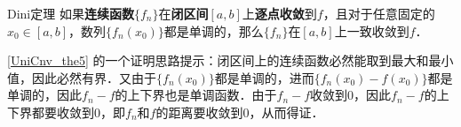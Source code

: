 \begin{theorem}{Dini定理}\label{UniCnv_the5}
如果\textbf{连续函数}$\{f_n\}$在\textbf{闭区间}$[a, b]$上\textbf{逐点收敛}到$f$，且对于任意固定的$x_0\in [a, b]$，数列$\{f_n(x_0)\}$都是单调的，那么$\{f_n\}$在$[a, b]$上一致收敛到$f$．
\end{theorem}

\autoref{UniCnv_the5} 的一个证明思路提示：闭区间上的连续函数必然能取到最大和最小值，因此必然有界．又由于$\{f_n(x_0)\}$都是单调的，进而$\{f_n(x_0)-f(x_0)\}$都是单调的，因此$f_n-f$的上下界也是单调函数．由于$f_n-f$收敛到$0$，因此$f_n-f$的上下界都要收敛到$0$，即$f_n$和$f$的距离要收敛到$0$，从而得证．









